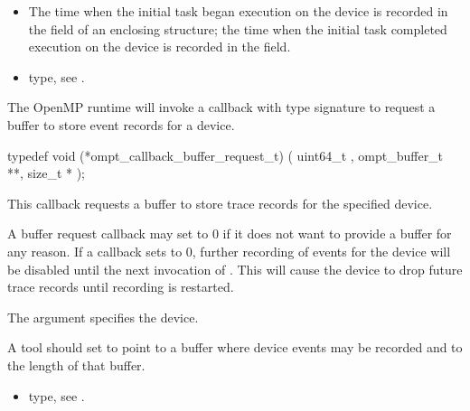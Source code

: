 \begin{itemize}
\begin{itemize}
\begin{itemize}
\item The time when the initial task began execution on the device is recorded in the  field of an enclosing
 structure; the time when the initial task completed execution on the device is recorded in the  field.
\end{itemize}

\crossreferences
\begin{itemize}
\item {} type, see
.
\end{itemize}


\label{sec:ompt_callback_buffer_request_t}

\summary
The OpenMP runtime will invoke a callback with type signature
 to request a
buffer to store event records for a device.

\format

\begin{ccppspecific}
\begin{omptCallback}
typedef void (*ompt_callback_buffer_request_t) (
  uint64_t ,
  ompt_buffer_t **,
  size_t *
);
\end{omptCallback}
\end{ccppspecific}


\descr
This callback requests a buffer to store trace records for the
specified device.

A buffer request callback may set  to 0 if it does not
want to provide a buffer for any reason. If a callback sets
 to 0, further recording of events for the device will be
disabled until the next invocation of .  This
will cause the device to drop future trace records until recording is
restarted.

\argdesc

The argument  specifies the device.

A tool should set  to point to a buffer where device events
may be recorded and  to the length of that buffer.

\crossreferences
\begin{itemize}
\item {} type, see
.
\end{itemize}


\end{itemize}
\end{itemize}

